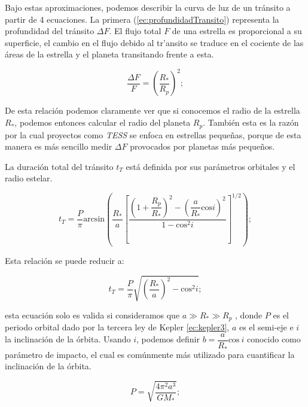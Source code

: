 Bajo estas aproximaciones, podemos describir la curva de luz de un tránsito a partir de 4 ecuaciones. La primera (\ref{ec:profundidadTransito}) representa la profundidad del tránsito $\Delta F$. El flujo total $F$ de una estrella es proporcional a su superficie, el cambio en el flujo debido al tr'ansito se traduce en el cociente de las áreas de la estrella y el planeta transitando frente a esta.

\begin{equation}
	\label{ec:profundidadTransito}
  \displaystyle \dfrac{\Delta F}{F}=\left(\dfrac{R_*}{R_p} \right)^{2} ;
\end{equation}

De esta relación podemos claramente ver que si conocemos el radio de la estrella $R_{*}$, podemos entonces calcular el radio del planeta $R_{p}$. También esta es la razón por la cual proyectos como \textit{TESS} se enfoca en estrellas pequeñas, porque de esta manera es más sencillo medir $\Delta F$ provocados por planetas más pequeños.

La duración total del tránsito $t_{T}$ está definida por sus parámetros orbitales y el radio estelar.

\begin{equation}
\label{ec:tiempoTransito}
\displaystyle t_{T}=\dfrac{P}{\pi} \mbox{arcsin} \left(\dfrac{R_{*}}{a}\left[ \dfrac{\left( 1+\dfrac{R_{p}}{R_{*}}\right)^{2}-\left( \dfrac{a}{R_{*}} \mbox{cos} i\right)^{2}}{1-\mbox{cos}^{2}i} \right]^{1/2}  \right); 
\end{equation}

Esta relación se puede reducir a:

\begin{equation}
\label{ec:tiempoTransitoReduc}
\displaystyle t_{T}=\dfrac{P}{\pi}\sqrt{\left(\dfrac{R_{*}}{a} \right)^{2}- \mbox{cos}^{2}i};
\end{equation}

esta ecuación solo es valida si consideramos que $a\gg R_{*}\gg R_{p}$ \cite{winn2010transits}, donde $P$ es el periodo orbital dado por la tercera ley de Kepler \ref{ec:kepler3}, $a$ es el semi-eje e $i$ la inclinación de la órbita. Usando $i$, podemos definir $b=\dfrac{a}{R_{*}}\mbox{cos}~i$ conocido como parámetro de impacto, el cual es comúnmente más utilizado para cuantificar la inclinación de la órbita. 

\begin{equation}
  \label{ec:kepler3}
  \displaystyle P=\sqrt{\dfrac{4\pi^{2}a^{3}}{GM_{*}}};
  \end{equation} 
  
